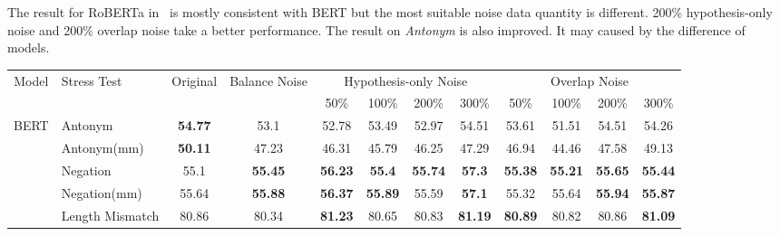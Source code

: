 The result for RoBERTa in~ is mostly consistent with BERT but the 
most suitable noise data quantity is different. 200\% hypothesis-only noise and 200\% overlap noise 
take a better performance. The result on \textit{Antonym} is also improved. It may caused by the difference of 
models.

\begin{table}[]
	\centering
	\scriptsize
\begin{tabular}{|c|l|c|c|c|c|c|c|c|c|c|c|}
\hline
\multirow{2}{*}{Model}                          & \multirow{2}{*}{Stress Test} & \multirow{2}{*}{Original} & \multirow{2}{*}{Balance Noise} & \multicolumn{4}{c|}{Hypothesis-only Noise}                        & \multicolumn{4}{c|}{Overlap Noise}                                \\ \cline{5-12} 
                                                &                              &                           &                                & 50\%           & 100\%          & 200\%          & 300\%          & 50\%           & 100\%          & 200\%          & 300\%          \\ \hline
\multirow{11}{*}{BERT}                          & Antonym                      & \textbf{54.77}            & 53.1                  & 52.78 & 53.49 & 52.97& 54.51 & 53.61 & 51.51          & 54.51 & 54.26 \\ \cline{2-12} 
                                                & Antonym(mm)                  & \textbf{50.11}            & 47.23                 & 46.31 & 45.79 & 46.25 & 47.29 & 46.94 & 44.46          & 47.58 & 49.13 \\ \cline{2-12} 
                                                & Negation                     & 55.1                      & \textbf{55.45}                 & \textbf{56.23} & \textbf{55.4}  & \textbf{55.74} & \textbf{57.3}  & \textbf{55.38} & \textbf{55.21} & \textbf{55.65} & \textbf{55.44} \\ \cline{2-12} 
                                                & Negation(mm)                 & 55.64                     & \textbf{55.88}                 & \textbf{56.37} & \textbf{55.89} & 55.59 & \textbf{57.1}  & 55.32 &55.64 & \textbf{55.94} & \textbf{55.87} \\ \cline{2-12} 
                                                & Length Mismatch              & 80.86                     & 80.34                 & \textbf{81.23} & 80.65          & 80.83          & \textbf{81.19} & \textbf{80.89} & 80.82          & 80.86 & \textbf{81.09} \\ \cline{2-12} 

\end{tabular}
\end{table}
